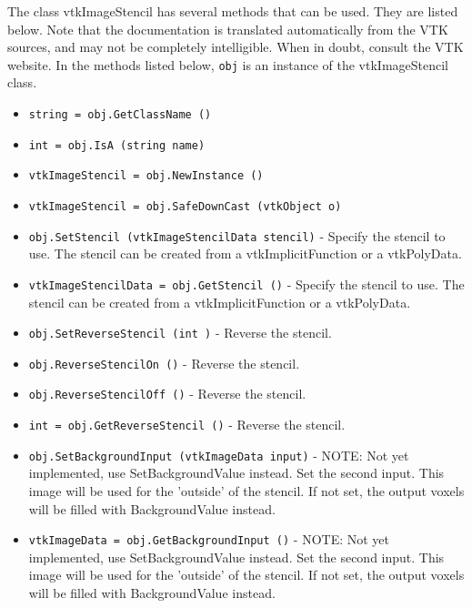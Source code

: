 The class vtkImageStencil has several methods that can be used.
  They are listed below.
Note that the documentation is translated automatically from the VTK sources,
and may not be completely intelligible.  When in doubt, consult the VTK website.
In the methods listed below, \verb|obj| is an instance of the vtkImageStencil class.
\begin{itemize}
\item  \verb|string = obj.GetClassName ()|

\item  \verb|int = obj.IsA (string name)|

\item  \verb|vtkImageStencil = obj.NewInstance ()|

\item  \verb|vtkImageStencil = obj.SafeDownCast (vtkObject o)|

\item  \verb|obj.SetStencil (vtkImageStencilData stencil)| -  Specify the stencil to use.  The stencil can be created
 from a vtkImplicitFunction or a vtkPolyData.

\item  \verb|vtkImageStencilData = obj.GetStencil ()| -  Specify the stencil to use.  The stencil can be created
 from a vtkImplicitFunction or a vtkPolyData.

\item  \verb|obj.SetReverseStencil (int )| -  Reverse the stencil.

\item  \verb|obj.ReverseStencilOn ()| -  Reverse the stencil.

\item  \verb|obj.ReverseStencilOff ()| -  Reverse the stencil.

\item  \verb|int = obj.GetReverseStencil ()| -  Reverse the stencil.

\item  \verb|obj.SetBackgroundInput (vtkImageData input)| -  NOTE: Not yet implemented, use SetBackgroundValue instead.
 Set the second input.  This image will be used for the 'outside' of the
 stencil.  If not set, the output voxels will be filled with
 BackgroundValue instead.

\item  \verb|vtkImageData = obj.GetBackgroundInput ()| -  NOTE: Not yet implemented, use SetBackgroundValue instead.
 Set the second input.  This image will be used for the 'outside' of the
 stencil.  If not set, the output voxels will be filled with
 BackgroundValue instead.


\end{itemize}
